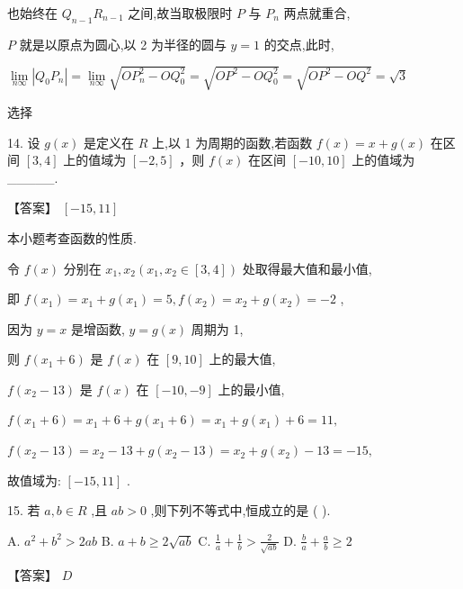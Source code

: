 \documentclass[10pt]{article}
\begin{document}
也始终在 \({Q}_{n - 1}{R}_{n - 1}\) 之间,故当取极限时 \(P\) 与 \({P}_{n}\) 两点就重合,

\(P\) 就是以原点为圆心,以 2 为半径的圆与 \(y = 1\) 的交点,此时,

\(\mathop{\lim }\limits_{{n\infty }}\left| {{Q}_{0}{P}_{n}}\right|  = \mathop{\lim }\limits_{{n\infty }}\sqrt{O{P}_{n}^{2} - O{Q}_{0}^{2}} = \sqrt{O{P}^{2} - O{Q}_{0}^{2}} = \sqrt{O{P}^{2} - O{Q}^{2}} = \sqrt{3}\)

选择

14. 设 \(g\left( x\right)\) 是定义在 \(R\) 上,以 1 为周期的函数,若函数 \(f\left( x\right)  = x + g\left( x\right)\) 在区间 \(\left\lbrack  {3,4}\right\rbrack\) 上的值域为 \(\left\lbrack  {-2,5}\right\rbrack\) ，则 \(f\left( x\right)\) 在区间 \(\left\lbrack  {-{10},{10}}\right\rbrack\) 上的值域为\_\_\_\_\_.

【答案】 \(\left\lbrack  {-{15},{11}}\right\rbrack\)

本小题考查函数的性质.

令 \(f\left( x\right)\) 分别在 \({x}_{1},{x}_{2}\left( {{x}_{1},{x}_{2} \in  \left\lbrack  {3,4}\right\rbrack  }\right)\) 处取得最大值和最小值,

即 \(f\left( {x}_{1}\right)  = {x}_{1} + g\left( {x}_{1}\right)  = 5,f\left( {x}_{2}\right)  = {x}_{2} + g\left( {x}_{2}\right)  =  - 2\) ,

因为 \(y = x\) 是增函数, \(y = g\left( x\right)\) 周期为 1,

则 \(f\left( {{x}_{1} + 6}\right)\) 是 \(f\left( x\right)\) 在 \(\left\lbrack  {9,{10}}\right\rbrack\) 上的最大值,

\(f\left( {{x}_{2} - {13}}\right)\) 是 \(f\left( x\right)\) 在 \(\left\lbrack  {-{10}, - 9}\right\rbrack\) 上的最小值,

\(f\left( {{x}_{1} + 6}\right)  = {x}_{1} + 6 + g\left( {{x}_{1} + 6}\right)  = {x}_{1} + g\left( {x}_{1}\right)  + 6 = {11},\)

\(f\left( {{x}_{2} - {13}}\right)  = {x}_{2} - {13} + g\left( {{x}_{2} - {13}}\right)  = {x}_{2} + g\left( {x}_{2}\right)  - {13} =  - {15},\)

故值域为: \(\left\lbrack  {-{15},{11}}\right\rbrack\) .

15. 若 \(a,b \in  R\) ,且 \({ab} > 0\) ,则下列不等式中,恒成立的是 ( ).

A. \({a}^{2} + {b}^{2} > {2ab}\) B. \(a + b \geq  2\sqrt{ab}\) C. \(\frac{1}{a} + \frac{1}{b} > \frac{2}{\sqrt{ab}}\) D. \(\frac{b}{a} + \frac{a}{b} \geq  2\)

【答案】 \(D\)
\end{document}
